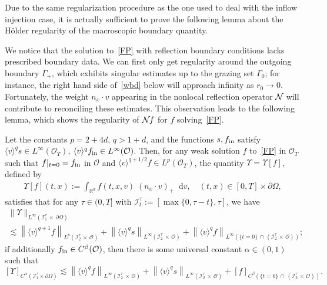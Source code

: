\documentclass[AHL,Unicode,longabstracts,published]{cedram}
\newcommand*{\dif}{\mathop{}\!\mathrm{d}}
\newcommand*\p{\partial}
\newcommand*\fin {f_{\rm in}}
\newcommand*\R {\mathbb{R}}
\newcommand*\I {\mathcal{I}}
\newcommand*\NN {{\mathcal{N}\hspace{-.3mm}}}
\newcommand*\OO {\mathcal{O}}
\newcommand{\lv}{\langle v\rangle}
\begin{document}
Due to the same regularization procedure as the one used to deal with the inflow injection case, it is actually sufficient to prove the following lemma about the H\"older regularity of the macroscopic boundary quantity.

We notice that the solution to~\eqref{FP} with reflection boundary conditions lacks prescribed boundary data. We can first only get regularity around the outgoing boundary $\Gamma_+$, which exhibits singular estimates up to the grazing set $\Gamma_0$; for instance, the right hand side of~\eqref{wbd} below will approach infinity as $r_0\rightarrow 0$. Fortunately, the weight $n_x\cdot v$ appearing in the nonlocal reflection operator $\NN$ will contribute to reconciling these estimates. This observation leads to the following lemma, which shows the regularity of $\NN f$ for $f$ solving~\eqref{FP}.

\begin{lemm}\label{diffusedata}
Let the constants $p=2+4d$, $q>1+d$, and the functions $s,\fin$ satisfy $\lv^qs\in L^\infty(\OO_T)$, $\lv^q\fin\in L^\infty(\OO)$. Then, for any weak solution $f$ to~\eqref{FP} in $\OO_T$ such that $f|_{t=0}=\fin$ in $\OO$ and $\lv^{q+1/2} f\in L^p(\OO_T)$, the quantity $\Upsilon=\Upsilon[f]$, defined by
\begin{align*}
\Upsilon[f](t,x):=\int_{\R^d}f(t,x,v)\;\!(n_x\cdot v)_+\dif v,
\quad (t,x)\in [0,T]\times\p\Omega,
\end{align*}
satisfies that for any $\tau\in(0,T]$ with $\I_t^\tau:=[\max\{0,\tau-t\},\tau]$, we have
\begin{multline}\label{databdd}
\|\Upsilon\|_{L^\infty\left(\I_1^\tau\,\times\,\p\Omega\right)}\\
\lesssim \left\|\lv^{q+1} f\right\|_{L^p\left(\I_2^\tau\,\times\,\OO\right)} + \left\|\lv^qs\right\|_{L^\infty\left(\I_2^\tau\,\times\,\OO\right)} + \left\|\lv^qf\right\|_{L^\infty\left(\{t=0\}\,\cap\,\left(\I_2^\tau\,\times\,\OO\right)\right)};
\end{multline}
if additionally $\fin\in C^\beta(\OO)$, then there is some universal constant $\alpha\in(0,1)$ such that
\begin{equation}\label{dataholder}
[\Upsilon]_{C^\alpha\left(\I_1^\tau\times\p\Omega\right)}
\lesssim \left\|\lv^{q} f\right\|_{L^\infty\left(\I_2^\tau\,\times\,\OO\right)} + \left\|\lv^qs\right\|_{L^\infty\left(\I_2^\tau\,\times\,\OO\right)} +[f]_{C^\beta\left(\{t=0\}\,\cap\,\left(\I_2^\tau\,\times\,\OO\right)\right)}.
\end{equation}
\end{lemm}
\end{document}
